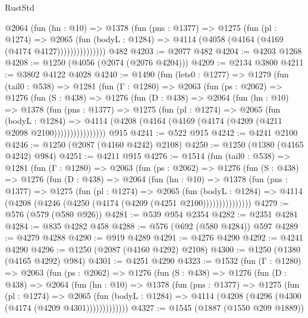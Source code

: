 \begin{lexlean}{RustStd}
\begin{coremodule}
{\begin{coremodule}
{{{{{{{{{{{{{                @2064
                  (fun (hn : @10) =>
                  @1378
                    (fun (pns : @1377) =>
                    @1275
                      (fun (pl : @1274) =>
                      @2065
                        (fun (bodyL : @1284) =>
                        @4114 (@4058 (@4164 (@4169 (@4174 @4127)))))))))))))))
    @482
@4203 := @2077 @482
@4204 := @4203 @1268
@4208 := @1250 (@4056 (@2074 (@2076 @4204)))
@4209 := @2134 @3800
@4211 := @3802 @4122 @4028
@4240 := @1490
    (fun (lets0 : @1277) =>
    @1279
      (fun (tail0 : @538) =>
      @1281
        (fun (Γ : @1280) =>
        @2063
          (fun (ps : @2062) =>
          @1276
            (fun (S : @438) =>
            @1276
              (fun (D : @438) =>
              @2064
                (fun (hn : @10) =>
                @1378
                  (fun (pns : @1377) =>
                  @1275
                    (fun (pl : @1274) =>
                    @2065
                      (fun (bodyL : @1284) =>
                      @4114 (@4208 (@4164 (@4169 (@4174 (@4209 (@4211 @2098 @2100))))))))))))))))
    @915
@4241 := @522 @915
@4242 := @4241 @2100
@4246 := @1250 (@2087 (@4160 @4242) @2108)
@4250 := @1250 (@1380 (@4165 @4242) @984)
@4251 := @4211 @915
@4276 := @1514
    (fun (tail0 : @538) =>
    @1281
      (fun (Γ : @1280) =>
      @2063
        (fun (ps : @2062) =>
        @1276
          (fun (S : @438) =>
          @1276
            (fun (D : @438) =>
            @2064
              (fun (hn : @10) =>
              @1378
                (fun (pns : @1377) =>
                @1275
                  (fun (pl : @1274) =>
                  @2065
                    (fun (bodyL : @1284) =>
                    @4114 (@4208 (@4246 (@4250 (@4174 (@4209 (@4251 @2100)))))))))))))))
@4279 := @576 (@579 (@580 @926))
@4281 := @539 @954 @2354
@4282 := @2351 @4281
@4284 := @835 @4282 @458
@4288 := @576 (@692 (@580 @4284)) @597
@4289 := @4279 @4288
@4290 := @919 @4289
@4291 := @4276 @4290
@4292 := @4241 @4290
@4296 := @1250 (@2087 (@4160 @4292) @2108)
@4300 := @1250 (@1380 (@4165 @4292) @984)
@4301 := @4251 @4290
@4323 := @1532
    (fun (Γ : @1280) =>
    @2063
      (fun (ps : @2062) =>
      @1276
        (fun (S : @438) =>
        @1276
          (fun (D : @438) =>
          @2064
            (fun (hn : @10) =>
            @1378
              (fun (pns : @1377) =>
              @1275
                (fun (pl : @1274) =>
                @2065
                  (fun (bodyL : @1284) =>
                  @4114 (@4208 (@4296 (@4300 (@4174 (@4209 @4301)))))))))))))
@4327 := @1545 (@1887 (@1550 @209 @1889))
}}}}}}}}}}}}}
\end{coremodule}}
\end{coremodule}
\end{lexlean}

